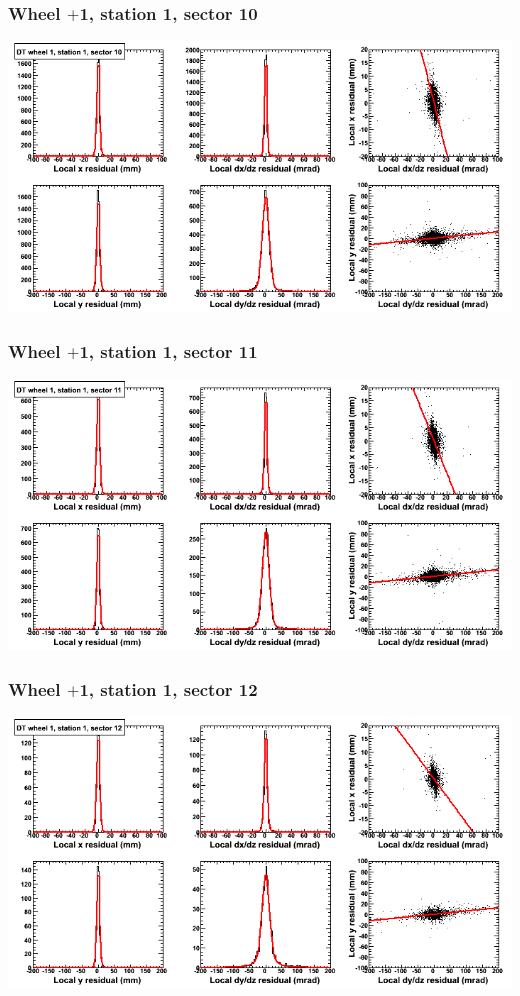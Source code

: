 \documentclass[compress]{beamer}
\begin{document}
\begin{frame}
\frametitle{Wheel $+$1, station 1, sector 10}
\includegraphics[width=\linewidth]{tmpbell_MBwhDst1sec10.png}
\end{frame}

\begin{frame}
\frametitle{Wheel $+$1, station 1, sector 11}
\includegraphics[width=\linewidth]{tmpbell_MBwhDst1sec11.png}
\end{frame}

\begin{frame}
\frametitle{Wheel $+$1, station 1, sector 12}
\includegraphics[width=\linewidth]{tmpbell_MBwhDst1sec12.png}
\end{frame}
\end{document}
